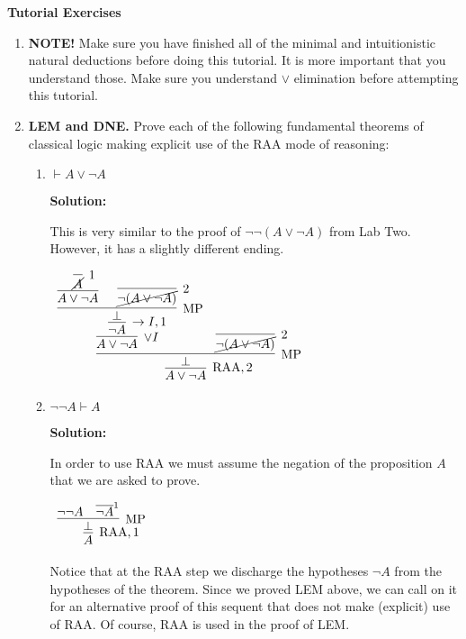 \documentclass[11pt]{report}
\newcommand{\temp}[2]{{\overline{#2}}^{#1}}
\begin{document}
\newpage
{\bf Tutorial Exercises}
\begin{enumerate}

	\item \textbf{NOTE!} Make sure you have finished all of the minimal and intuitionistic natural deductions before doing this tutorial. It is more important that you understand those. Make sure you understand $\lor$ elimination before attempting this tutorial. 
	
	\item \textbf{LEM and DNE.} Prove each of the following fundamental theorems of classical logic making explicit use of the RAA mode of reasoning: 
	
	\begin{enumerate}
		\item $\vdash A \lor \neg A$
		
		\textbf{Solution:}

		This is very similar to the proof of $\lnot \lnot (A \lor \lnot A)$ from Lab Two. However, it has a slightly different ending.

			\begin{center}
				$\begin{array}{c}
					\infer[\RAA,2]{A \lor \lnot A}
						{\infer[\MP]{\bot}
							{\infer[\lor I]{A \lor \lnot A}
								{\infer[\to I,1]{\lnot A}
									{\infer[\MP]{\bot}
										{\infer[]{A \lor \lnot A}{\infer[1]{\cancel{A}}{}}
										&
										\infer[2]{\cancel{\lnot (A \lor \lnot A)}}{}}}}
							&
							\infer[2]{\cancel{\lnot(A \lor \lnot A)}}{}}}
				\end{array}$
			\end{center}

		\item $\neg\neg A \vdash A$ 
		
		\textbf{Solution:}

			In order to use RAA we must assume the negation of the proposition $A$ that we are asked to prove. 

			\begin{center}
				$\begin{array}{c}
					\infer[\RAA,1]{A}
						{\infer[\MP]{\bot}
							{\lnot \lnot A
							&
							\temp{1}{\lnot A}}}
				\end{array}$
			\end{center}

			Notice that at the RAA step we discharge the hypotheses $\lnot A$ from the hypotheses of the theorem. Since we proved LEM above, we can call on it for an alternative proof of this sequent that does not make (explicit) use of RAA. Of course, RAA is used in the proof of LEM. 


\end{enumerate}
\end{enumerate}
\end{document}
